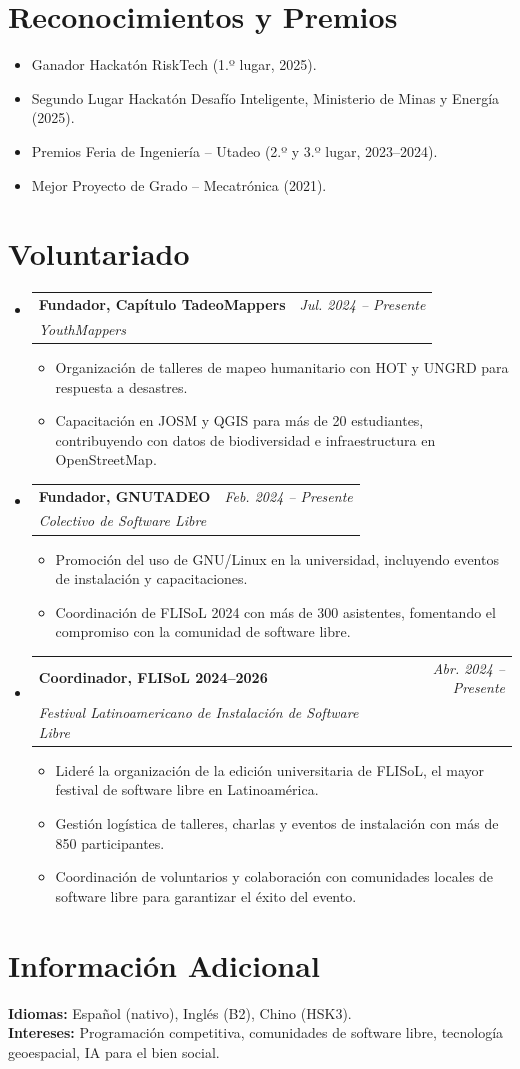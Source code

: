 \documentclass[a4paper,11pt]{article}
\makeatletter
\newcommand{\resumeProject}[4]{
\vspace{0.5mm}\item
    \begin{tabular*}{0.98\textwidth}[t]{l@{\extracolsep{\fill}}r}
        \textbf{#1} & \textit{\footnotesize{#3}} \\
        \footnotesize{\textit{#2}} & \footnotesize{#4}
    \end{tabular*}
    \vspace{-2.4mm}
}
\newcommand{\resumeSubHeadingListStart}{\begin{itemize}[leftmargin=*,labelsep=1mm]}
\newcommand{\resumeItemListStart}{\begin{itemize}[leftmargin=*,labelsep=1mm,itemsep=0.5mm]}
\newcommand{\resumeSubHeadingListEnd}{\end{itemize}\vspace{2mm}}
\newcommand{\resumeItemListEnd}{\end{itemize}\vspace{-2mm}}
\makeatother
\begin{document}
\section{\textbf{Reconocimientos y Premios}}
\resumeSubHeadingListStart
\item Ganador Hackatón RiskTech (1.º lugar, 2025).
\item Segundo Lugar Hackatón Desafío Inteligente, Ministerio de Minas y Energía (2025).
\item Premios Feria de Ingeniería – Utadeo (2.º y 3.º lugar, 2023–2024).
\item Mejor Proyecto de Grado – Mecatrónica (2021).
\resumeSubHeadingListEnd


\section{\textbf{Voluntariado}}
\resumeSubHeadingListStart

\resumeProject
  {Fundador, Capítulo TadeoMappers}{YouthMappers}{Jul. 2024 -- Presente}{ }
\resumeItemListStart
  \item Organización de talleres de mapeo humanitario con HOT y UNGRD para respuesta a desastres.
  \item Capacitación en JOSM y QGIS para más de 20 estudiantes, contribuyendo con datos de biodiversidad e infraestructura en OpenStreetMap.
\resumeItemListEnd

\resumeProject
  {Fundador, GNUTADEO}{Colectivo de Software Libre}{Feb. 2024 -- Presente}{ }
\resumeItemListStart
  \item Promoción del uso de GNU/Linux en la universidad, incluyendo eventos de instalación y capacitaciones.
  \item Coordinación de FLISoL 2024 con más de 300 asistentes, fomentando el compromiso con la comunidad de software libre.
\resumeItemListEnd

\resumeProject
  {Coordinador, FLISoL 2024--2026}{Festival Latinoamericano de Instalación de Software Libre}{Abr. 2024 -- Presente}{ }
\resumeItemListStart
  \item Lideré la organización de la edición universitaria de FLISoL, el mayor festival de software libre en Latinoamérica.
  \item Gestión logística de talleres, charlas y eventos de instalación con más de 850 participantes.
  \item Coordinación de voluntarios y colaboración con comunidades locales de software libre para garantizar el éxito del evento.
\resumeItemListEnd

\resumeSubHeadingListEnd

\section{\textbf{Información Adicional}}
\small{
\textbf{Idiomas:} Español (nativo), Inglés (B2), Chino (HSK3). \\
\textbf{Intereses:} Programación competitiva, comunidades de software libre, tecnología geoespacial, IA para el bien social.
}
\end{document}
